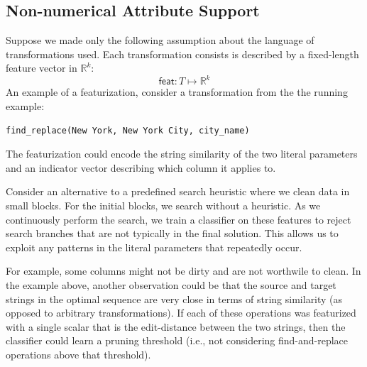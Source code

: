 \subsection{Non-numerical Attribute Support}
Suppose we made only the following assumption about the language of transformations used.
Each transformation consists is described by a fixed-length feature vector in $\mathbb{R}^k$:
\[
\textsf{feat}: T \mapsto \mathbb{R}^k 
\]
An example of a featurization, consider a transformation from the the running example:
\begin{lstlisting}
find_replace(New York, New York City, city_name)
\end{lstlisting}
The featurization could encode the string similarity of the two literal parameters and an indicator vector describing which column it applies to.

Consider an alternative to a predefined search heuristic where we clean data in small blocks.
For the initial blocks, we search without a heuristic.
As we continuously perform the search, we train a classifier on these features to reject search branches that are not typically in the final solution.
This allows us to exploit any patterns in the literal parameters that repeatedly occur.

For example, some columns might not be dirty and are not worthwile to clean.
In the example above, another observation could be that the source and target strings in the optimal sequence are very close in terms of string similarity (as opposed to arbitrary transformations).
If each of these operations was featurized with a single scalar that is the edit-distance between the two strings, then the classifier could learn a pruning threshold (i.e., not considering find-and-replace operations above that threshold).



